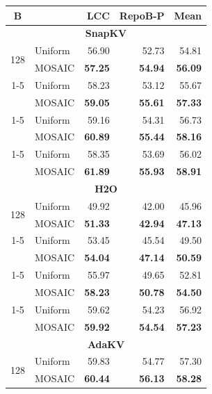 \begin{table}[tp]
  \centering
  \scriptsize
  \setlength{\tabcolsep}{5pt}
  \renewcommand{\arraystretch}{0.92}
  \begin{tabular}{@{} c l rrr @{}}
    \toprule
    \textbf{B} & & \textbf{LCC} & \textbf{RepoB-P} & \textbf{Mean} \\
    \midrule
    \multicolumn{5}{c}{\textbf{SnapKV}} \\
    \midrule
    \multirow{2}{*}{128} & Uniform & 56.90 & 52.73 & 54.81 \\
     & MOSAIC & \textbf{57.25} & \textbf{54.94} & \textbf{56.09} \\
    \cmidrule(l){1-5}
    \multirow{2}{*}{256} & Uniform & 58.23 & 53.12 & 55.67 \\
     & MOSAIC & \textbf{59.05} & \textbf{55.61} & \textbf{57.33} \\
    \cmidrule(l){1-5}
    \multirow{2}{*}{512} & Uniform & 59.16 & 54.31 & 56.73 \\
     & MOSAIC & \textbf{60.89} & \textbf{55.44} & \textbf{58.16} \\
    \cmidrule(l){1-5}
    \multirow{2}{*}{1024} & Uniform & 58.35 & 53.69 & 56.02 \\
     & MOSAIC & \textbf{61.89} & \textbf{55.93} & \textbf{58.91} \\
    \midrule
    \multicolumn{5}{c}{\textbf{H2O}} \\
    \midrule
    \multirow{2}{*}{128} & Uniform & 49.92 & 42.00 & 45.96 \\
     & MOSAIC & \textbf{51.33} & \textbf{42.94} & \textbf{47.13} \\
    \cmidrule(l){1-5}
    \multirow{2}{*}{256} & Uniform & 53.45 & 45.54 & 49.50 \\
     & MOSAIC & \textbf{54.04} & \textbf{47.14} & \textbf{50.59} \\
    \cmidrule(l){1-5}
    \multirow{2}{*}{512} & Uniform & 55.97 & 49.65 & 52.81 \\
     & MOSAIC & \textbf{58.23} & \textbf{50.78} & \textbf{54.50} \\
    \cmidrule(l){1-5}
    \multirow{2}{*}{1024} & Uniform & 59.62 & 54.23 & 56.92 \\
     & MOSAIC & \textbf{59.92} & \textbf{54.54} & \textbf{57.23} \\
    \midrule
    \multicolumn{5}{c}{\textbf{AdaKV}} \\
    \midrule
    \multirow{2}{*}{128} & Uniform & 59.83 & 54.77 & 57.30 \\
     & MOSAIC & \textbf{60.44} & \textbf{56.13} & \textbf{58.28} \\

\end{tabular}
\end{table}
